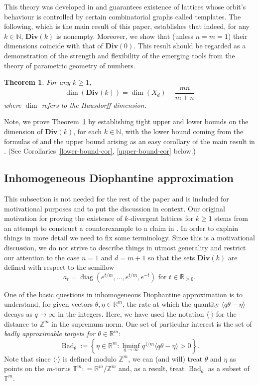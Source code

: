 \documentclass[reqno,11pt]{amsart}
\theoremstyle{plain}
\newtheorem{thm}{Theorem}[section]
\theoremstyle{definition}
\theoremstyle{remark}
\numberwithin{equation}{section}
\newcommand{\D}{\mathbf{Div}}
\newcommand{\R}{{\mathbb{R}}}
\newcommand{\Z}{{\mathbb{Z}}}
\newcommand{\N}{{\mathbb{N}}}
\newcommand{\bR}{\mathbb{R}}
\newcommand{\bZ}{\mathbb{Z}}
\newcommand{\bT}{\mathbb{T}}
\newcommand\seta[1]{\left\{#1\right\}}
\newcommand\idist[1]{\langle#1\rangle}
\newcommand\on[1]{\operatorname{#1}}
\begin{document}
This theory was developed in \cite{SS, Ro, DFSU, So} and guarantees existence of lattices whose orbit's behaviour is controlled  by certain combinatorial graphs called templates. The following, which is the main result 
of this paper, establishes that indeed, for any $k \in \N$, $\D(k)$ is nonempty. Moreover, we show that (unless $n=m=1$) their dimensions coincide with that of $\D(0)$. 
This result should be regarded as a demonstration of the strength and flexibility of the emerging tools from the theory of parametric geometry of numbers.
\begin{thm}\label{main-thm}
For any $k \ge 1$,   
\begin{equation}\label{eq: exact dimension}
   \dim (\D(k))   = \dim(X_d) - \frac{mn}{m+n}
\end{equation}
where $\dim$ refers to the Hausdorff dimension.
\end{thm}
Note, we prove Theorem~\ref{main-thm} by establishing tight upper and lower bounds on the dimension of $\D(k)$, for each $k \in \N$, with the lower bound coming from the formulas of \cite{DFSU} and the upper bound arising as an easy corollary of the main result in \cite{KKLM}. (See Corollaries~\ref{lower-bound-cor}, \ref{upper-bound-cor} below.)
\subsection{Inhomogeneous Diophantine approximation}\label{subsec:motivation}
This subsection is not needed for the rest of the paper and is included for motivational purposes and to put the discussion in context.
Our original motivation for proving the existence of $k$-divergent lattices for $k\ge 1$ stems from an attempt to construct a counterexample to a claim in \cite{Sh1}. In order to explain things in more detail we need to fix some terminology. Since this is a motivational discussion, we do not strive to describe things in utmost generality and restrict our attention to the case  $n=1$ 
 and $d=m+1$ so that
the sets $\D(k)$ are defined with respect to the semiflow 
\begin{equation*}
    a_t = \operatorname{diag}(e^{t/m}, \dots, e^{t/m}, e^{-t}) \text{ for } t \in \R_{\geq 0}.
\end{equation*}

One of the basic questions in inhomogeneous Diophantine approximation is to understand, for given vectors $\theta,\eta\in \bR^m$,  
the rate at which the quantity $\idist{q\theta - \eta}$ decays as $q\to \infty$ in the integers. Here, we have used the notation
$\langle \cdot \rangle$ for the distance to $\Z^m$ in the supremum norm. One set of particular interest is the set of \textit{badly approximable targets for} $\theta \in \R^m$: 
$$\on{Bad}_\theta :=\seta{\eta\in \bR^m : \liminf_{q\to\infty} q^{1/m}\idist{q\theta - \eta} > 0}.$$
Note that since $\idist{\cdot}$ is defined modulo $\bZ^m$, we can (and will) treat $\theta$ and $\eta$ as points on the $m$-torus $\bT^m: = \bR^m/\bZ^m$ and, as a result, treat $\on{Bad}_\theta$ as a subset of $\bT^m$. 
\end{document}
